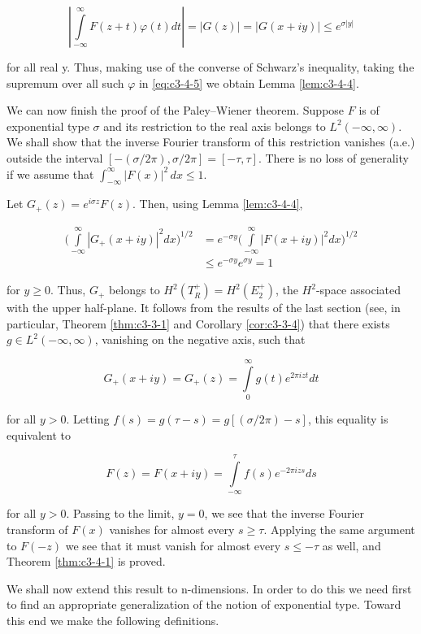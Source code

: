 \begin{equation}\label{eq:c3-4-5}
\left|\int\limits_{-\infty}^{\infty}F(z+t)\varphi(t)dt\right|=\left|G(z)\right|=\left|G(x+iy)\right|\leq e^{\sigma|y|}
\end{equation}

for all real y. Thus, making use of the converse of Schwarz's inequality, taking the supremum over all such $\varphi$ in \eqref{eq:c3-4-5} we obtain Lemma \ref{lem:c3-4-4}.

We can now finish the proof of the Paley--Wiener theorem. Suppose $F$ is of exponential type $\sigma$ and its restriction to the real axis belongs to $L^2(-\infty, \infty)$. We shall show that the inverse Fourier transform of this restriction vanishes (a.e.) outside the interval $[-(\sigma/2\pi), \sigma/2\pi] = [-\tau, \tau]$. There is no loss of generality if we assume that $\int_{-\infty}^{\infty} |F(x)|^2 \, dx \leq 1$.

Let $G_{+}(z) = e^{i\sigma z} F(z)$. Then, using Lemma \ref{lem:c3-4-4},

\[
\begin{aligned}\biggl(\int\limits_{-\infty}^{\infty}|G_{+}(x+iy)|^{2}dx\biggr)^{1/2}&=e^{-\sigma y}\biggl(\int\limits_{-\infty}^{\infty}|F(x+iy)|^{2}dx\biggr)^{1/2}\\&\leq e^{-\sigma y}e^{\sigma y}=1\end{aligned}
\]

for $y \geq 0$. Thus, $G_+$ belongs to $H^2(T_R^+) = H^2(E_2^+)$, the $H^2$-space associated with the upper half-plane. It follows from the results of the last section (see, in particular, Theorem \ref{thm:c3-3-1} and Corollary \ref{cor:c3-3-4}) that there exists $g \in L^2(-\infty, \infty)$, vanishing on the negative axis, such that

\[
G_{+}(x+i y)=G_{+}(z)=\int\limits_{0}^{\infty}g(t)e^{2\pi i z t}d t
\]

for all $y > 0$. Letting $f(s) = g(\tau - s) = g[(\sigma/2\pi) - s]$, this equality is equivalent to

\[
F(z)=F(x+i y)=\int\limits_{-\infty}^{\tau}f(s)e^{-2\pi i z s}d s
\]

for all $y > 0$. Passing to the limit, $y = 0$, we see that the inverse Fourier transform of $F(x)$ vanishes for almost every $s \geq \tau$. Applying the same argument to $F(-z)$ we see that it must vanish for almost every $s \leq -\tau$ as well, and Theorem \ref{thm:c3-4-1} is proved.

We shall now extend this result to n-dimensions. In order to do this we need first to find an appropriate generalization of the notion of exponential type. Toward this end we make the following definitions.

